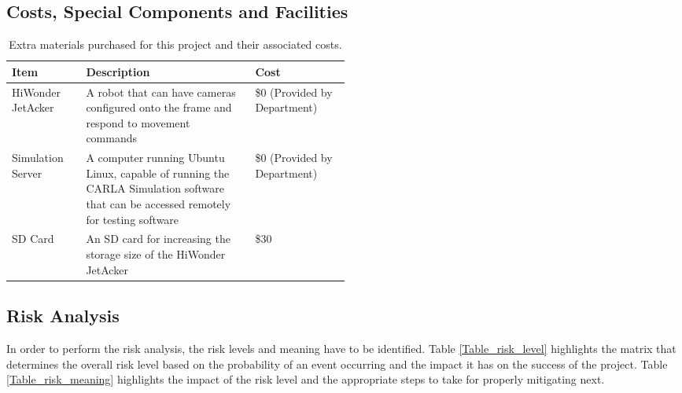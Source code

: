 \documentclass[titlepage, draft]{article}
\begin{document}
\subsection{Costs, Special Components and Facilities}
\begin{table}[H]
	\centering
	\begin{tabular}{@{}lp{0.5\linewidth}l@{}}
		\toprule
		\textbf{Item}     & \textbf{Description}                                                                                                                 & \textbf{Cost}                \\ \midrule
		HiWonder JetAcker & A robot that can have cameras configured onto the frame and respond to movement commands                                             & \$0 (Provided by Department) \\ \midrule
		Simulation Server & A computer running Ubuntu Linux, capable of running the CARLA Simulation software that can be accessed remotely for testing software & \$0 (Provided by Department) \\ \midrule
		SD Card           & An SD card for increasing the storage size of the HiWonder JetAcker                                                                  & \$30                         \\ \bottomrule
	\end{tabular}
	\caption{Extra materials purchased for this project and their associated costs.}
	\label{tab:costs}
\end{table}

\subsection{Risk Analysis}

In order to perform the risk analysis, the risk levels and meaning have to be identified. Table \ref{Table_risk_level} highlights the matrix that determines the overall risk level based on the probability of an event occurring and the impact it has on the success of the project. Table \ref{Table_risk_meaning} highlights the impact of the risk level and the appropriate steps to take for properly mitigating next.
\end{document}
